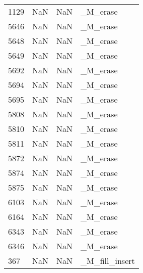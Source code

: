 \begin{tabular}{llll}
1129 &                   NaN &                        NaN &                                  \_M\_erase \\
5646 &                   NaN &                        NaN &                                  \_M\_erase \\
5648 &                   NaN &                        NaN &                                  \_M\_erase \\
5649 &                   NaN &                        NaN &                                  \_M\_erase \\
5692 &                   NaN &                        NaN &                                  \_M\_erase \\
5694 &                   NaN &                        NaN &                                  \_M\_erase \\
5695 &                   NaN &                        NaN &                                  \_M\_erase \\
5808 &                   NaN &                        NaN &                                  \_M\_erase \\
5810 &                   NaN &                        NaN &                                  \_M\_erase \\
5811 &                   NaN &                        NaN &                                  \_M\_erase \\
5872 &                   NaN &                        NaN &                                  \_M\_erase \\
5874 &                   NaN &                        NaN &                                  \_M\_erase \\
5875 &                   NaN &                        NaN &                                  \_M\_erase \\
6103 &                   NaN &                        NaN &                                  \_M\_erase \\
6164 &                   NaN &                        NaN &                                  \_M\_erase \\
6343 &                   NaN &                        NaN &                                  \_M\_erase \\
6346 &                   NaN &                        NaN &                                  \_M\_erase \\
367  &                   NaN &                        NaN &                            \_M\_fill\_insert \\

\end{tabular}
